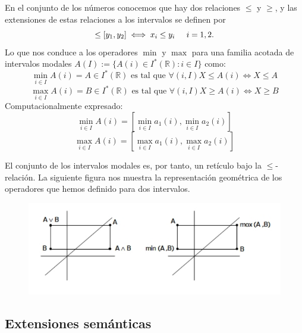 En el conjunto de los números conocemos que hay dos relaciones $\leq$ y $\geq$, y las extensiones de estas relaciones a los intervalos se definen por
\begin{equation}
[x_1,x_2] \leq [y_1,y_2] \iff x_i \leq y_i \hspace{0.5cm} i = 1,2.
\nonumber
\end{equation}
Lo que nos conduce a los operadores $\min$ y $\max$ para una familia acotada de intervalos modales $A(I) := \{ A(i) \in I^*(\mathbb{R}) : i \in I \}$ como:
\begin{equation}
\min_{i \in I} A(i) = A \in I^*(\mathbb{R}) \text{ es  tal que } \forall (i,I) X \leq A(i) \iff X \leq A
\nonumber
\end{equation}
\begin{equation}
\max_{i \in I} A(i) = B \in I^*(\mathbb{R}) \text{ es  tal que } \forall (i,I) X \geq A(i) \iff X \geq B
\nonumber
\end{equation}
Computacionalmente expresado:
\begin{equation}
\min_{i \in I} A(i) = [\min_{i \in I} a_1(i), \min_{i \in I} a_2(i)]
\nonumber
\end{equation}
\begin{equation}
\max_{i \in I} A(i) = [\max_{i \in I} a_1(i), \max_{i \in I} a_2(i)]
\nonumber
\end{equation}

El conjunto de los intervalos modales es, por tanto, un retículo bajo la $\leq$-relación. La siguiente figura nos muestra la representación geométrica de los operadores que hemos definido para dos intervalos.
\begin{figure}[h]
\centering
\includegraphics[scale=0.5]{images/florez12.png}
\end{figure}

\subsection{Extensiones semánticas}

